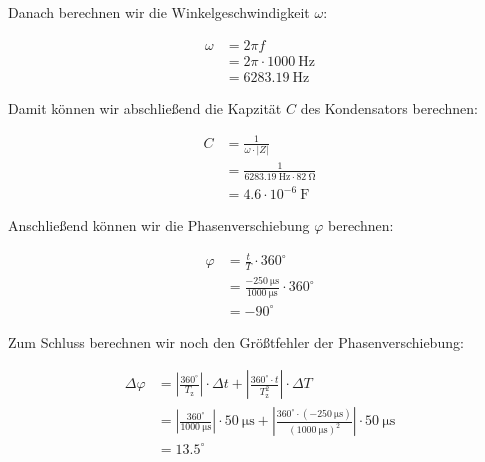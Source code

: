             Danach berechnen wir die Winkelgeschwindigkeit $\omega$:

            \begin{equation}
                \begin{aligned}
                    \omega &= 2 \pi f\\
                           &= 2 \pi \cdot 1000\ \mathrm{Hz}\\
                           &= 6283.19\ \mathrm{Hz}
                \end{aligned}
                \label{eq:Versuch2_Kondensator_Winkelgeschwindigkeit}
            \end{equation}

            Damit können wir abschließend die Kapzität $C$ des Kondensators berechnen:

            \begin{equation}
                \begin{aligned}
                    C &= \frac{1}{\omega \cdot |Z|}\\
                      &= \frac{1}{6283.19\ \mathrm{Hz} \cdot 82\ \mathrm{\Omega}}\\
                      &= 4.6 \cdot 10^{-6}\ \mathrm{F}
                \end{aligned}
                \label{eq:Versuch2_Kondensator_Kapazität}
            \end{equation}

            Anschließend können wir die Phasenverschiebung $\varphi$ berechnen:

            \begin{equation}
                \begin{aligned}
                    \varphi &= \frac{t}{T} \cdot 360^{\circ}\\
                         &= \frac{-250\ \mathrm{\mu s}}{1000\ \mathrm{\mu s}} \cdot 360^{\circ}\\
                         &= -90^{\circ}
                \end{aligned}
                \label{eq:Versuch2_Kondensator_Phasenverschiebung}
            \end{equation}

            Zum Schluss berechnen wir noch den Größtfehler der Phasenverschiebung:

            \begin{equation}
                \begin{aligned}
                    \Delta \varphi &= \left|\frac{360^{\circ}}{T_{\mathrm{z}}}\right| \cdot \Delta t + \left|\frac{360^{\circ} \cdot t}{T_{\mathrm{z}}^{2}}\right| \cdot \Delta T\\
                                   &= \left|\frac{360^{\circ}}{1000\ \mathrm{\mu s}}\right| \cdot 50\ \mathrm{\mu s} + \left|\frac{360^{\circ} \cdot (-250\ \mathrm{\mu s})}{(1000\ \mathrm{\mu s})^{2}}\right| \cdot 50\ \mathrm{\mu s}\\
                                   &= 13.5^{\circ}
                \end{aligned}
                \label{eq:Versuch2_Kondensator_Phasenverschiebung_Fehler}
            \end{equation}

